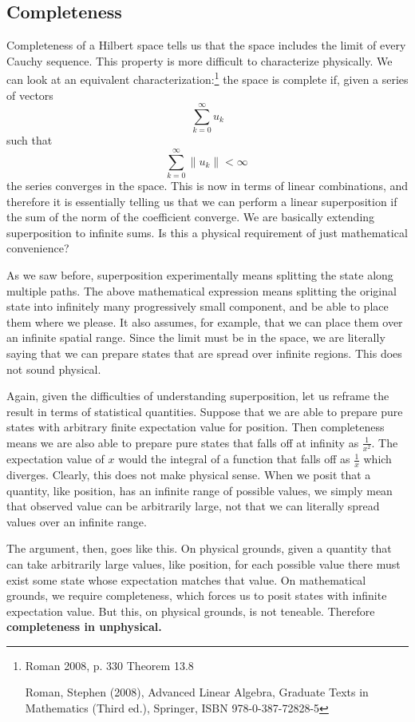 \documentclass[10pt,twocolumn, nofootinbib]{revtex4-2}
\begin{document}
\subsection{Completeness}

Completeness of a Hilbert space tells us that the space includes the limit of every Cauchy sequence. This property is more difficult to characterize physically. We can look at an equivalent characterization:\footnote{Roman 2008, p. 330 Theorem 13.8
	
	Roman, Stephen (2008), Advanced Linear Algebra, Graduate Texts in Mathematics (Third ed.), Springer, ISBN 978-0-387-72828-5} the space is complete if, given a series of vectors
$$ \sum _{k=0}^{\infty }u_{k}$$
such that
$$ \sum _{k=0}^{\infty }\|u_{k}\|<\infty \,$$
the series converges in the space. This is now in terms of linear combinations, and therefore it is essentially telling us that we can perform a linear superposition if the sum of the norm of the coefficient converge. We are basically extending superposition to infinite sums. Is this a physical requirement of just mathematical convenience?

As we saw before, superposition experimentally means splitting the state along multiple paths. The above mathematical expression means splitting the original state into infinitely many progressively small component, and be able to place them where we please. It also assumes, for example, that we can place them over an infinite spatial range. Since the limit must be in the space, we are literally saying that we can prepare states that are spread over infinite regions. This does not sound physical.

Again, given the difficulties of understanding superposition, let us reframe the result in terms of statistical quantities. Suppose that we are able to prepare pure states with arbitrary finite expectation value for position. Then completeness means we are also able to prepare pure states that falls off at infinity as $\frac{1}{x^2}$. The expectation value of $x$ would the integral of a function that falls off as $\frac{1}{x}$ which diverges. Clearly, this does not make physical sense. When we posit that a quantity, like position, has an infinite range of possible values, we simply mean that observed value can be arbitrarily large, not that we can literally spread values over an infinite range. 

The argument, then, goes like this. On physical grounds, given a quantity that can take arbitrarily large values, like position, for each possible value there must exist some state whose expectation matches that value. On mathematical grounds, we require completeness, which forces us to posit states with infinite expectation value. But this, on physical grounds, is not teneable. Therefore \textbf{completeness in unphysical.}
\end{document}
